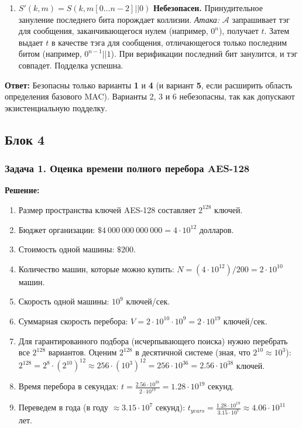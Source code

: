 \begin{enumerate}
\item
  \textbf{\(S'(k, m) = S(k, m[0\dots n-2] || 0)\)} \textbf{Небезопасен.} Принудительное зануление последнего бита порождает коллизии. \emph{Атака:} \(\mathcal{A}\) запрашивает тэг для сообщения, заканчивающегося нулем (например, \(0^n\)), получает \(t\). Затем выдает \(t\) в качестве тэга для сообщения, отличающегося только последним битом (например, \(0^{n-1}||1\)). При верификации последний бит занулится, и тэг совпадет. Подделка успешна.
\end{enumerate}

\textbf{Ответ:} Безопасны только варианты \textbf{1} и \textbf{4} (и вариант \textbf{5}, если расширить область определения базового MAC). Варианты 2, 3 и 6 небезопасны, так как допускают экзистенциальную подделку.

\subsection{Блок 4}\label{ux431ux43bux43eux43a-4}

\subsubsection{Задача 1. Оценка времени полного перебора AES-128}\label{ux437ux430ux434ux430ux447ux430-1.-ux43eux446ux435ux43dux43aux430-ux432ux440ux435ux43cux435ux43dux438-ux43fux43eux43bux43dux43eux433ux43e-ux43fux435ux440ux435ux431ux43eux440ux430-aes-128}

\textbf{Решение:}

\begin{enumerate}
\def\labelenumi{\arabic{enumi}.}
\tightlist
\item
  Размер пространства ключей AES-128 составляет \(2^{128}\) ключей.
\item
  Бюджет организации: \(\$4\ 000\ 000\ 000\ 000 = 4 \cdot 10^{12}\) долларов.
\item
  Стоимость одной машины: \(\$200\).
\item
  Количество машин, которые можно купить: \(N = (4 \cdot 10^{12}) / 200 = 2 \cdot 10^{10}\) машин.
\item
  Скорость одной машины: \(10^9\) ключей/сек.
\item
  Суммарная скорость перебора: \(V = 2 \cdot 10^{10} \cdot 10^9 = 2 \cdot 10^{19}\) ключей/сек.
\item
  Для гарантированного подбора (исчерпывающего поиска) нужно перебрать все \(2^{128}\) вариантов. Оценим \(2^{128}\) в десятичной системе (зная, что \(2^{10} \approx 10^3\)): \(2^{128} = 2^8 \cdot (2^{10})^{12} \approx 256 \cdot (10^3)^{12} = 256 \cdot 10^{36} = 2.56 \cdot 10^{38}\) ключей.
\item
  Время перебора в секундах: \(t = \frac{2.56 \cdot 10^{38}}{2 \cdot 10^{19}} = 1.28 \cdot 10^{19}\) секунд.
\item
  Переведем в года (в году \(\approx 3.15 \cdot 10^7\) секунд): \(t_{years} = \frac{1.28 \cdot 10^{19}}{3.15 \cdot 10^7} \approx 4.06 \cdot 10^{11}\) лет.
\end{enumerate}

